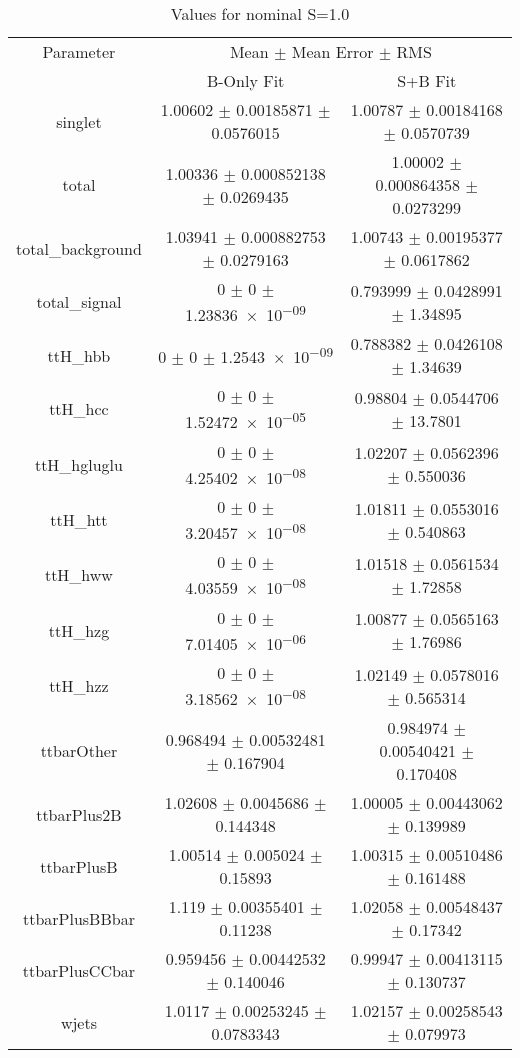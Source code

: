 \begin{table}
\centering
\caption{Values for nominal S=1.0}
\begin{tabular}{ccc}
\toprule
Parameter & \multicolumn{2}{c}{Mean $\pm$ Mean Error $\pm$ RMS}\\
 & B-Only Fit & S+B Fit\\
\midrule
singlet & \num{1.00602} $\pm$ \num{0.00185871} $\pm$ \num{0.0576015} & \num{1.00787} $\pm$ \num{0.00184168} $\pm$ \num{0.0570739}\\
total & \num{1.00336} $\pm$ \num{0.000852138} $\pm$ \num{0.0269435} & \num{1.00002} $\pm$ \num{0.000864358} $\pm$ \num{0.0273299}\\
total\_background & \num{1.03941} $\pm$ \num{0.000882753} $\pm$ \num{0.0279163} & \num{1.00743} $\pm$ \num{0.00195377} $\pm$ \num{0.0617862}\\
total\_signal & \num{0} $\pm$ \num{0} $\pm$ \num{1.23836e-09} & \num{0.793999} $\pm$ \num{0.0428991} $\pm$ \num{1.34895}\\
ttH\_hbb & \num{0} $\pm$ \num{0} $\pm$ \num{1.2543e-09} & \num{0.788382} $\pm$ \num{0.0426108} $\pm$ \num{1.34639}\\
ttH\_hcc & \num{0} $\pm$ \num{0} $\pm$ \num{1.52472e-05} & \num{0.98804} $\pm$ \num{0.0544706} $\pm$ \num{13.7801}\\
ttH\_hgluglu & \num{0} $\pm$ \num{0} $\pm$ \num{4.25402e-08} & \num{1.02207} $\pm$ \num{0.0562396} $\pm$ \num{0.550036}\\
ttH\_htt & \num{0} $\pm$ \num{0} $\pm$ \num{3.20457e-08} & \num{1.01811} $\pm$ \num{0.0553016} $\pm$ \num{0.540863}\\
ttH\_hww & \num{0} $\pm$ \num{0} $\pm$ \num{4.03559e-08} & \num{1.01518} $\pm$ \num{0.0561534} $\pm$ \num{1.72858}\\
ttH\_hzg & \num{0} $\pm$ \num{0} $\pm$ \num{7.01405e-06} & \num{1.00877} $\pm$ \num{0.0565163} $\pm$ \num{1.76986}\\
ttH\_hzz & \num{0} $\pm$ \num{0} $\pm$ \num{3.18562e-08} & \num{1.02149} $\pm$ \num{0.0578016} $\pm$ \num{0.565314}\\
ttbarOther & \num{0.968494} $\pm$ \num{0.00532481} $\pm$ \num{0.167904} & \num{0.984974} $\pm$ \num{0.00540421} $\pm$ \num{0.170408}\\
ttbarPlus2B & \num{1.02608} $\pm$ \num{0.0045686} $\pm$ \num{0.144348} & \num{1.00005} $\pm$ \num{0.00443062} $\pm$ \num{0.139989}\\
ttbarPlusB & \num{1.00514} $\pm$ \num{0.005024} $\pm$ \num{0.15893} & \num{1.00315} $\pm$ \num{0.00510486} $\pm$ \num{0.161488}\\
ttbarPlusBBbar & \num{1.119} $\pm$ \num{0.00355401} $\pm$ \num{0.11238} & \num{1.02058} $\pm$ \num{0.00548437} $\pm$ \num{0.17342}\\
ttbarPlusCCbar & \num{0.959456} $\pm$ \num{0.00442532} $\pm$ \num{0.140046} & \num{0.99947} $\pm$ \num{0.00413115} $\pm$ \num{0.130737}\\
wjets & \num{1.0117} $\pm$ \num{0.00253245} $\pm$ \num{0.0783343} & \num{1.02157} $\pm$ \num{0.00258543} $\pm$ \num{0.079973}\\
\bottomrule
\end{tabular}
\end{table}